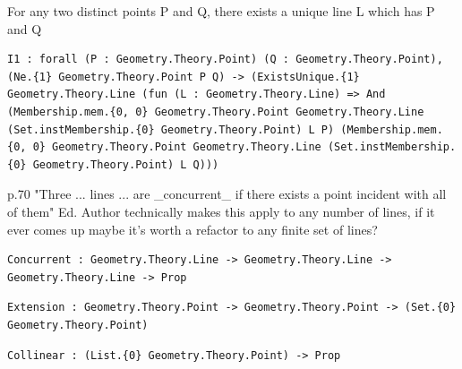 
\begin{lemma}
  \label{Geometry.Theory.I1}
  \leanok
  For any two distinct points P and Q, there exists a unique line L which has P and Q 
\begin{verbatim}I1 : forall (P : Geometry.Theory.Point) (Q : Geometry.Theory.Point), (Ne.{1} Geometry.Theory.Point P Q) -> (ExistsUnique.{1} Geometry.Theory.Line (fun (L : Geometry.Theory.Line) => And (Membership.mem.{0, 0} Geometry.Theory.Point Geometry.Theory.Line (Set.instMembership.{0} Geometry.Theory.Point) L P) (Membership.mem.{0, 0} Geometry.Theory.Point Geometry.Theory.Line (Set.instMembership.{0} Geometry.Theory.Point) L Q)))\end{verbatim}
\end{lemma}

\begin{definition}
  \label{Geometry.Theory.Concurrent}
  \leanok
  p.70 "Three ... lines ... are _concurrent_ if there exists a point incident with all of them"  Ed. Author technically makes this apply to any number of lines, if it ever comes up maybe it's worth a refactor to any finite set of lines? 
\begin{verbatim}Concurrent : Geometry.Theory.Line -> Geometry.Theory.Line -> Geometry.Theory.Line -> Prop\end{verbatim}
\end{definition}

\begin{definition}
  \label{Geometry.Theory.Extension}
  \leanok
\begin{verbatim}Extension : Geometry.Theory.Point -> Geometry.Theory.Point -> (Set.{0} Geometry.Theory.Point)\end{verbatim}
\end{definition}

\begin{definition}
  \label{Geometry.Theory.Collinear}
  \leanok
\begin{verbatim}Collinear : (List.{0} Geometry.Theory.Point) -> Prop\end{verbatim}
\end{definition}

